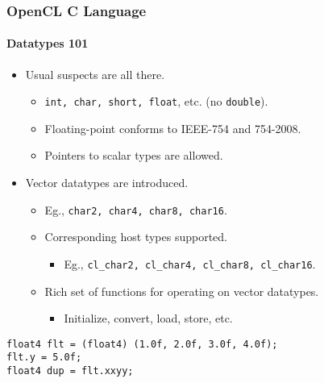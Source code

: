 \documentclass{beamer}
\newcommand{\code}[1]{\lstinline[basicstyle=\sffamily]{#1}}
\begin{document}
\begin{frame}[fragile]
\frametitle{OpenCL C Language}
\framesubtitle{Datatypes 101}

  \begin{itemize}
  \item Usual suspects are all there.
    \begin{itemize}
    \item \code{int, char, short, float}, etc. (no \code{double}).
    \item Floating-point conforms to IEEE-754 and 754-2008.
    \item Pointers to scalar types are allowed.
    \end{itemize}
  \item Vector datatypes are introduced.
    \begin{itemize}
    \item Eg., \code{char2, char4, char8, char16}.
    \item Corresponding host types supported.
      \begin{itemize}
      \item Eg., \code{cl_char2, cl_char4, cl_char8, cl_char16}.
      \end{itemize}
    \item Rich set of functions for operating on vector datatypes.
      \begin{itemize}
      \item Initialize, convert, load, store, etc.
      \end{itemize}
    \end{itemize}
  \end{itemize}

\begin{center}
\begin{minipage}{0.35\textwidth}
  \begin{lstlisting}[frame=trlb]
float4 flt = (float4) (1.0f, 2.0f, 3.0f, 4.0f);
flt.y = 5.0f;
float4 dup = flt.xxyy;
  \end{lstlisting}
\end{minipage}
\end{center}

\end{frame}
\end{document}
